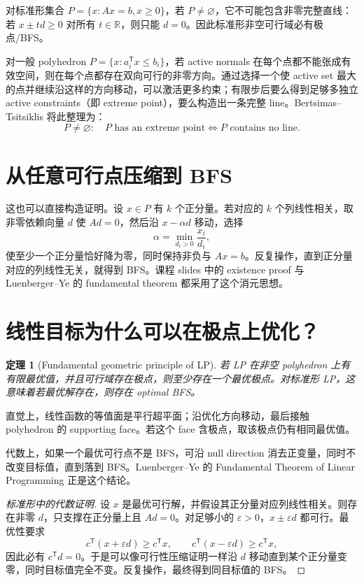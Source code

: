\documentclass[11pt,a4paper,openany]{ctexrep}
\newtheorem{theorem}{定理}[chapter]
\theoremstyle{definition}
\newcommand{\R}{\mathbb{R}}
\newcommand{\transpose}{\mathsf{T}}
\newcommand{\eps}{\varepsilon}
\begin{document}
对标准形集合 $P=\{x:Ax=b,x\ge0\}$，若 $P\ne\varnothing$，它不可能包含非零完整直线：若 $x\pm td\ge0$ 对所有 $t\in\R$，则只能 $d=0$。因此标准形非空可行域必有极点/BFS。


\begin{proofmap}
对一般 polyhedron $P=\{x:a_i^\transpose x\le b_i\}$，若 active normals 在每个点都不能张成有效空间，则在每个点都存在双向可行的非零方向。通过选择一个使 active set 最大的点并继续沿这样的方向移动，可以激活更多约束；有限步后要么得到足够多独立 active constraints（即 extreme point），要么构造出一条完整 line。Bertsimas--Tsitsiklis 将此整理为：
\[
P\ne\varnothing:\quad
P\text{ has an extreme point}
\Longleftrightarrow
P\text{ contains no line}.
\]
\cite[Ch.~2, \S2.5]{bertsimas}
\end{proofmap}

\section{从任意可行点压缩到 BFS}
这也可以直接构造证明。设 $x\in P$ 有 $k$ 个正分量。若对应的 $k$ 个列线性相关，取非零依赖向量 $d$ 使 $Ad=0$，然后沿 $x-\alpha d$ 移动，选择
\[
\alpha=\min_{d_i>0}\frac{x_i}{d_i},
\]
使至少一个正分量恰好降为零，同时保持非负与 $Ax=b$。反复操作，直到正分量对应的列线性无关，就得到 BFS。课程 slides 中的 existence proof 与 Luenberger--Ye 的 fundamental theorem 都采用了这个消元思想。\cite[Ch.~2]{luenberger}

\section{线性目标为什么可以在极点上优化？}

\begin{theorem}[Fundamental geometric principle of LP]
若 LP 在非空 polyhedron 上有有限最优值，并且可行域存在极点，则至少存在一个最优极点。对标准形 LP，这意味着若最优解存在，则存在 optimal BFS。
\end{theorem}

直觉上，线性函数的等值面是平行超平面；沿优化方向移动，最后接触 polyhedron 的 supporting face。若这个 face 含极点，取该极点仍有相同最优值。

代数上，如果一个最优可行点不是 BFS，可沿 null direction 消去正变量，同时不改变目标值，直到落到 BFS。Luenberger--Ye 的 Fundamental Theorem of Linear Programming 正是这个结论。\cite[Ch.~2]{luenberger}


\begin{proof}[标准形中的代数证明]
设 $x$ 是最优可行解，并假设其正分量对应列线性相关。则存在非零 $d$，只支撑在正分量上且 $Ad=0$。对足够小的 $\eps>0$，$x\pm\eps d$ 都可行。最优性要求
\[
c^\transpose(x+\eps d)\ge c^\transpose x,
\qquad
c^\transpose(x-\eps d)\ge c^\transpose x,
\]
因此必有 $c^\transpose d=0$。于是可以像可行性压缩证明一样沿 $d$ 移动直到某个正分量变零，同时目标值完全不变。反复操作，最终得到同目标值的 BFS。
\end{proof}
\end{document}
